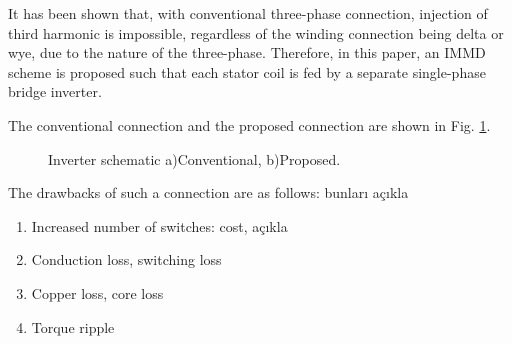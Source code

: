\documentclass[conference,a4paper,twocolumn]{IEEEtran}
\begin{document}
It has been shown that, with conventional three-phase connection, injection of third harmonic is impossible, regardless of the winding connection being delta or wye, due to the nature of the three-phase. Therefore, in this paper, an IMMD scheme is proposed such that each stator coil is fed by a separate single-phase bridge inverter.

The conventional connection and the proposed connection are shown in Fig. \ref{fig:conv_conn}.


\begin{figure}[] 
\centering
{} \hfil 
{}
\caption{Inverter schematic a)Conventional, b)Proposed.} 
\label{fig:conv_conn} 
\end{figure}

The drawbacks of such a connection are as follows: bunları açıkla

\begin{enumerate}
  \item Increased number of switches: cost, açıkla
  \item Conduction loss, switching loss
  \item Copper loss, core loss
  \item Torque ripple
\end{enumerate}
\end{document}

